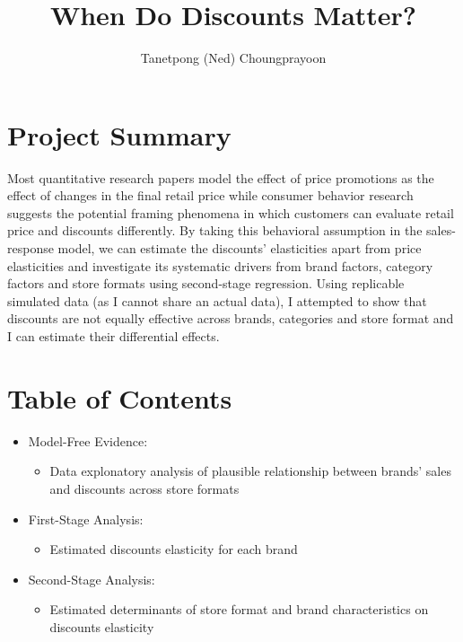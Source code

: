 \documentclass[
]{article}
\title{When Do Discounts Matter?}
\author{Tanetpong (Ned) Choungprayoon}
\date{}
\providecommand{\tightlist}{%
  \setlength{\itemsep}{0pt}\setlength{\parskip}{0pt}}
\begin{document}
\maketitle

\section{\centering Project Summary}

Most quantitative research papers model the effect of price promotions
as the effect of changes in the final retail price while consumer
behavior research suggests the potential framing phenomena in which
customers can evaluate retail price and discounts differently. By taking
this behavioral assumption in the sales-response model, we can estimate
the discounts' elasticities apart from price elasticities and
investigate its systematic drivers from brand factors, category factors
and store formats using second-stage regression. Using replicable
simulated data (as I cannot share an actual data), I attempted to show
that discounts are not equally effective across brands, categories and
store format and I can estimate their differential effects.

\section{\centering Table of Contents}

\begin{itemize}
\tightlist
\item
  Model-Free Evidence:

  \begin{itemize}
  \tightlist
  \item
    Data explonatory analysis of plausible relationship between brands'
    sales and discounts across store formats
  \end{itemize}
\item
  First-Stage Analysis:

  \begin{itemize}
  \tightlist
  \item
    Estimated discounts elasticity for each brand
  \end{itemize}
\item
  Second-Stage Analysis:

  \begin{itemize}
  \tightlist
  \item
    Estimated determinants of store format and brand characteristics on
    discounts elasticity
  \end{itemize}
\end{itemize}
\end{document}
